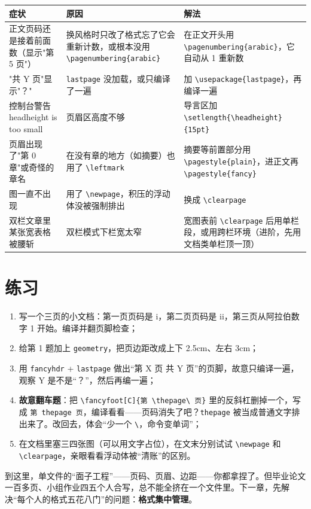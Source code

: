 
\begin{table}[htbp]
\centering
\small
\begin{tabularx}{\linewidth}{@{}*{3}{>{\raggedright\arraybackslash}X}@{}}
\toprule
\textbf{症状} & \textbf{原因} & \textbf{解法} \\
\midrule
正文页码还是接着前面数（显示"第 5 页"） & 换风格时只改了格式忘了它会重新计数，或根本没用 \texttt{\textbackslash{}pagenumbering\{arabic\}} & 在正文开头用 \texttt{\textbackslash{}pagenumbering\{arabic\}}，它自动从 1 重新数 \\
"共 Y 页"显示"？" & \texttt{lastpage} 没加载，或只编译了一遍 & 加 \texttt{\textbackslash{}usepackage\{lastpage\}}，再编译一遍 \\
控制台警告 headheight is too small & 页眉区高度不够 & 导言区加 \texttt{\textbackslash{}setlength\{\textbackslash{}headheight\}\{15pt\}} \\
页眉出现了"第 0 章"或奇怪的章名 & 在没有章的地方（如摘要）也用了 \texttt{\textbackslash{}leftmark} & 摘要等前置部分用 \texttt{\textbackslash{}pagestyle\{plain\}}，进正文再 \texttt{\textbackslash{}pagestyle\{fancy\}} \\
图一直不出现 & 用了 \texttt{\textbackslash{}newpage}，积压的浮动体没被强制排出 & 换成 \texttt{\textbackslash{}clearpage} \\
双栏文章里某张宽表格被腰斩 & 双栏模式下栏宽太窄 & 宽图表前 \texttt{\textbackslash{}clearpage} 后用单栏段，或用跨栏环境（进阶，先用文档类单栏顶一顶） \\
\bottomrule
\end{tabularx}
\end{table}

\section*{练习}

\begin{enumerate}
\setlength{\itemsep}{2pt}
\item 写一个三页的小文档：第一页页码是 i，第二页页码是 ii，第三页从阿拉伯数字 1 开始。编译并翻页脚检查；
\item 给第 1 题加上 \texttt{geometry}，把页边距改成上下 2.5cm、左右 3cm；
\item 用 \texttt{fancyhdr} + \texttt{lastpage} 做出“第 X 页 共 Y 页”的页脚，故意只编译一遍，观察 Y 是不是“？”，然后再编一遍；
\item \textbf{故意翻车题}：把 \texttt{\textbackslash{}fancyfoot[C]\{第 \textbackslash{}thepage\textbackslash{} 页\}} 里的反斜杠删掉一个，写成 \texttt{第 thepage 页}，编译看看——页码消失了吧？\texttt{thepage} 被当成普通文字排出来了。改回去，体会“少一个 \texttt{\textbackslash{}}，命令变单词”；
\item 在文档里塞三四张图（可以用文字占位），在文末分别试试 \texttt{\textbackslash{}newpage} 和 \texttt{\textbackslash{}clearpage}，亲眼看看浮动体被“清账”的区别。
\end{enumerate}

到这里，单文件的“面子工程”——页码、页眉、边距——你都拿捏了。但毕业论文一百多页、小组作业四五个人合写，总不能全挤在一个文件里。下一章，先解决“每个人的格式五花八门”的问题：\textbf{格式集中管理}。
